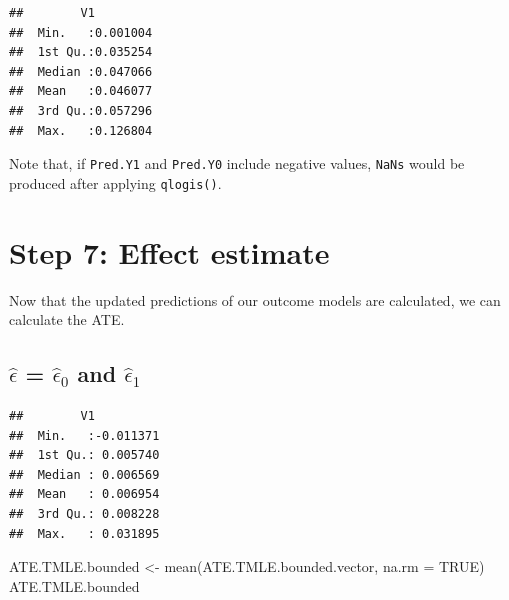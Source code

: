 \documentclass[
]{book}
\newenvironment{Shaded}{\begin{snugshade}}{\end{snugshade}}
\newcommand{\AttributeTok}[1]{\textcolor[rgb]{0.77,0.63,0.00}{#1}}
\newcommand{\ConstantTok}[1]{\textcolor[rgb]{0.00,0.00,0.00}{#1}}
\newcommand{\FunctionTok}[1]{\textcolor[rgb]{0.00,0.00,0.00}{#1}}
\newcommand{\NormalTok}[1]{#1}
\newcommand{\OtherTok}[1]{\textcolor[rgb]{0.56,0.35,0.01}{#1}}
\newcommand{\SpecialCharTok}[1]{\textcolor[rgb]{0.00,0.00,0.00}{#1}}
\begin{document}
\begin{verbatim}
##        V1          
##  Min.   :0.001004  
##  1st Qu.:0.035254  
##  Median :0.047066  
##  Mean   :0.046077  
##  3rd Qu.:0.057296  
##  Max.   :0.126804
\end{verbatim}

Note that, if \texttt{Pred.Y1} and \texttt{Pred.Y0} include negative values, \texttt{NaNs} would be produced after applying \texttt{qlogis()}.

\hypertarget{step-7-effect-estimate}{%
\section{Step 7: Effect estimate}\label{step-7-effect-estimate}}

Now that the updated predictions of our outcome models are calculated, we can calculate the ATE.

\hypertarget{hatepsilon-hatepsilon_0-and-hatepsilon_1-2}{%
\subsection{\texorpdfstring{\(\hat\epsilon\) = \(\hat\epsilon_0\) and \(\hat\epsilon_1\)}{\textbackslash hat\textbackslash epsilon = \textbackslash hat\textbackslash epsilon\_0 and \textbackslash hat\textbackslash epsilon\_1}}\label{hatepsilon-hatepsilon_0-and-hatepsilon_1-2}}

\begin{Shaded}
\end{Shaded}

\begin{verbatim}
##        V1           
##  Min.   :-0.011371  
##  1st Qu.: 0.005740  
##  Median : 0.006569  
##  Mean   : 0.006954  
##  3rd Qu.: 0.008228  
##  Max.   : 0.031895
\end{verbatim}

\begin{Shaded}
\begin{Highlighting}[]
\NormalTok{ATE.TMLE.bounded }\OtherTok{\textless{}{-}} \FunctionTok{mean}\NormalTok{(ATE.TMLE.bounded.vector, }
                         \AttributeTok{na.rm =} \ConstantTok{TRUE}\NormalTok{) }
\NormalTok{ATE.TMLE.bounded }
\end{Highlighting}
\end{Shaded}
\end{document}
